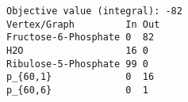 \begin{verbatim}
Objective value (integral): -82
Vertex/Graph         In Out 
Fructose-6-Phosphate 0  82  
H2O                  16 0   
Ribulose-5-Phosphate 99 0   
p_{60,1}             0  16  
p_{60,6}             0  1   
\end{verbatim}
